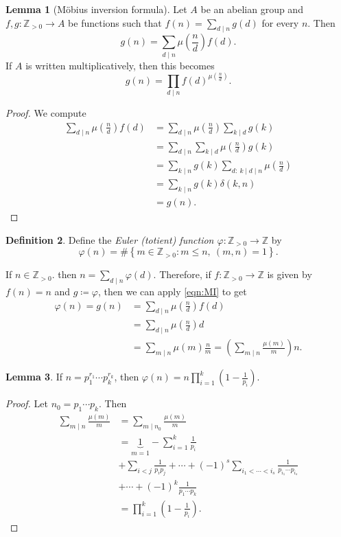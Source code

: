 \documentclass[10pt,letterpaper,cm]{nupset}
\theoremstyle{definition}
\newtheorem{definition}{Definition}[subsection]
\theoremstyle{theorem}
\newtheorem{lemma}[definition]{Lemma}
\theoremstyle{remark}
\newcommand{\Z}{\mathbb Z}
\newcommand{\1}{\mathbf{1}}
\newcommand{\0}{\vec 0}
\begin{document}
\begin{lemma}[M\"{o}bius inversion formula]
Let $A$ be an abelian group and $f,g: \Z_{>0}\to A$ be functions such that $f(n) = \sum_{d\mid n}g(d)$ for every $n$. Then
\[
\label{eqn:MI} g(n) = \sum_{d\mid n}\mu \left(\frac{n}{d} \right)f(d). \tag{$\dagger$}
\] If $A$ is written multiplicatively, then this becomes  $$g(n) = \prod_{d\mid n}f(d)^{\mu \left(\frac{n}{d} \right)}.$$
\end{lemma}
\begin{proof}
We compute
\begin{align*}
 \sum_{d\mid n}\mu \left(\frac{n}{d} \right)f(d) & = \sum_{d\mid n}\mu \left(\frac{n}{d} \right)\sum_{k\mid d}g(k)
 \\ & = \sum_{d\mid n}\sum_{k\mid d}\mu \left(\frac{n}{d} \right) g(k)
 \\ & = \sum_{k\mid n}g(k) \sum_{d:\ k\mid d \mid n}\mu \left(\frac{n}{d} \right)
 \\ & = \sum_{k\mid n}g(k) \delta(k,n)
 \\ & = g(n).
\end{align*}
\end{proof}

\begin{definition}
Define the \textit{Euler (totient) function $\varphi : \Z_{>0}\to \Z$} by $$\varphi(n)= \#\left\{m\in \Z_{>0} : m\leq  n, \ (m,n)=1\right\}.$$
\end{definition}

\smallskip

If $n\in \Z_{>0}$. then $n=\sum_{d\mid n}\varphi(d)$. Therefore, if $f: \Z_{>0} \to \Z$ is given by $f(n) =n$ and $g\coloneqq \varphi$, then we can apply \eqref{eqn:MI} to get 
\begin{align*}
 \varphi(n)  = g(n) & = \sum_{d\mid n} \mu \left(\frac{n}{d} \right)f(d)
 \\ & =  \sum_{d\mid n} \mu \left(\frac{n}{d} \right)d
 \\ & = \sum_{m \mid n} \mu(m)\frac{n}{m} =  \left( \sum_{m \mid n} \frac{\mu(m)}{m}\right) n
. \end{align*}


\begin{lemma}
If $n= p_1^{r_1} \cdots p_k^{r_k}$, then $\varphi(n) =n\prod_{i=1}^k \left(1- \frac{1}{p_i} \right)$.
\end{lemma}
\begin{proof}
Let $n_0 = p_1 \cdots p_k$. Then
\begin{align*}
\sum_{m\mid n}\frac{\mu(m)}{m} & = \sum_{m\mid n_0}\frac{\mu(m)}{m}
\\ & = \underbrace{1}_{m=1} -\sum_{i=1}^k \frac{1}{p_i}
\\ & + \sum_{i<j}\frac{1}{p_ip_j} +\cdots + ({-1})^s \sum_{i_1 < \cdots < i_s}\frac{1}{p_{i_1}\cdots p_{i_s}}
\\ & + \cdots  +({-1})^k\frac{1}{p_1\cdots p_k}
\\ & = \prod_{i=1}^k \left(1- \frac{1}{p_i}\right).
\end{align*}
\end{proof}
\end{document}
